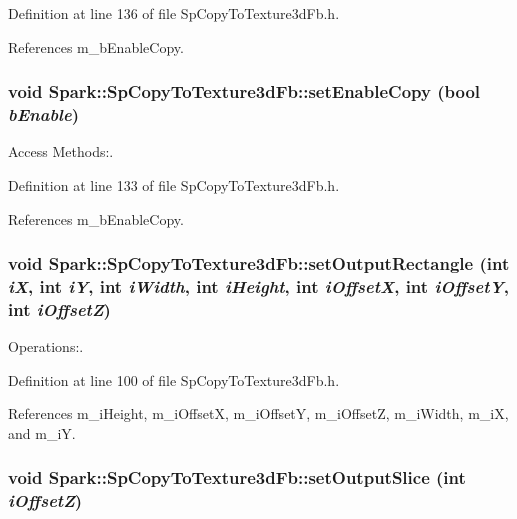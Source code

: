 Definition at line 136 of file Sp\-Copy\-To\-Texture3d\-Fb.h.

References m\_\-b\-Enable\-Copy.
\subsubsection{\setlength{\rightskip}{0pt plus 5cm}void Spark::Sp\-Copy\-To\-Texture3d\-Fb::set\-Enable\-Copy (bool {\em b\-Enable})\hspace{0.3cm}{\tt  [inline]}}\label{classSpark_1_1SpCopyToTexture3dFb_a8}


Access Methods:. 

Definition at line 133 of file Sp\-Copy\-To\-Texture3d\-Fb.h.

References m\_\-b\-Enable\-Copy.
\subsubsection{\setlength{\rightskip}{0pt plus 5cm}void Spark::Sp\-Copy\-To\-Texture3d\-Fb::set\-Output\-Rectangle (int {\em i\-X}, int {\em i\-Y}, int {\em i\-Width}, int {\em i\-Height}, int {\em i\-Offset\-X}, int {\em i\-Offset\-Y}, int {\em i\-Offset\-Z})\hspace{0.3cm}{\tt  [inline]}}\label{classSpark_1_1SpCopyToTexture3dFb_a4}


Operations:. 

Definition at line 100 of file Sp\-Copy\-To\-Texture3d\-Fb.h.

References m\_\-i\-Height, m\_\-i\-Offset\-X, m\_\-i\-Offset\-Y, m\_\-i\-Offset\-Z, m\_\-i\-Width, m\_\-i\-X, and m\_\-i\-Y.
\subsubsection{\setlength{\rightskip}{0pt plus 5cm}void Spark::Sp\-Copy\-To\-Texture3d\-Fb::set\-Output\-Slice (int {\em i\-Offset\-Z})\hspace{0.3cm}{\tt  [inline]}}\label{classSpark_1_1SpCopyToTexture3dFb_a5}


